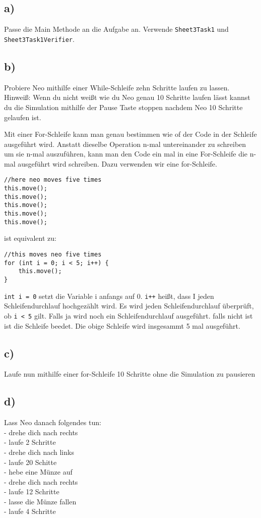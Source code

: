 \subsection*{a)}
	Passe die Main Methode an die Aufgabe an. Verwende \lstinline{Sheet3Task1} und \lstinline{Sheet3Task1Verifier}.
\subsection*{b)}
	Probiere Neo mithilfe einer While-Schleife zehn Schritte laufen zu lassen.\\
	Hinweiß: Wenn du nicht weißt wie du Neo genau 10 Schritte laufen lässt kannst du die Simulation mithilfe der Pause Taste stoppen nachdem Neo 10 Schritte gelaufen ist.

\begin{Infobox}
		Mit einer For-Schleife kann man genau bestimmen wie of der Code in der Schleife ausgeführt wird.
		Anstatt dieselbe Operation n-mal untereinander zu schreiben um sie n-mal auszuführen, kann man den Code ein mal in eine For-Schleife die n-mal ausgeführt wird schreiben.
		Dazu verwenden wir eine for-Schleife. 
		\begin{lstlisting}
//here neo moves five times
this.move();
this.move();
this.move();
this.move();
this.move();
		\end{lstlisting}
		ist equivalent zu:
		\begin{lstlisting}
//this moves neo five times
for (int i = 0; i < 5; i++) {
	this.move();
}
		\end{lstlisting}
 \lstinline{int i = 0} setzt die Variable i anfangs auf 0.  \lstinline{i++} heißt, dass I jeden Schleifendurchlauf hochgezählt wird. Es wird jeden Schleifendurchlauf überprüft, ob  \lstinline{i < 5} gilt. Falls ja wird noch ein Schleifendurchlauf ausgeführt. falls nicht ist ist die Schleife beedet. Die obige Schleife wird insgesammt 5 mal ausgeführt.
 \end{Infobox}

\subsection*{c)}
Laufe nun mithilfe einer for-Schleife 10 Schritte ohne die Simulation zu pausieren

\subsection*{d)}
Lass Neo danach folgendes tun:\\
	- drehe dich nach rechts\\
	- laufe 2 Schritte\\
	- drehe dich nach links\\ 
	- laufe 20 Schitte\\
	- hebe eine Münze auf\\
	- drehe dich nach rechts\\
	- laufe 12 Schritte\\
	- lasse die Münze fallen\\
	- laufe 4 Schritte


